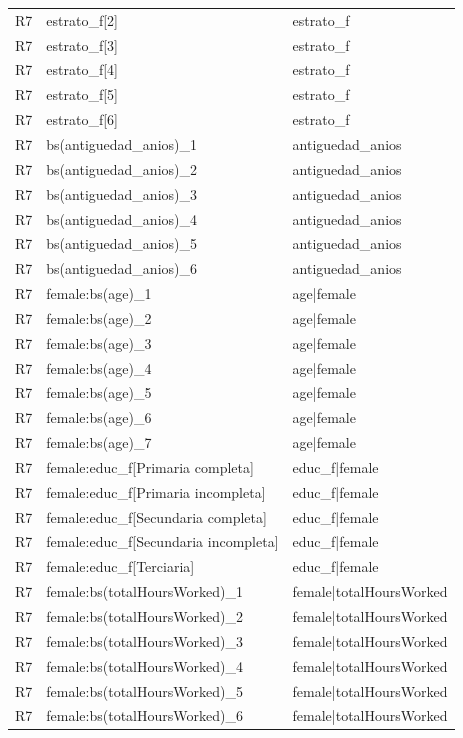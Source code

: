 \begin{longtable}{lll}
R7 & estrato\_f[2] & estrato\_f \\
R7 & estrato\_f[3] & estrato\_f \\
R7 & estrato\_f[4] & estrato\_f \\
R7 & estrato\_f[5] & estrato\_f \\
R7 & estrato\_f[6] & estrato\_f \\
R7 & bs(antiguedad\_anios)\_1 & antiguedad\_anios \\
R7 & bs(antiguedad\_anios)\_2 & antiguedad\_anios \\
R7 & bs(antiguedad\_anios)\_3 & antiguedad\_anios \\
R7 & bs(antiguedad\_anios)\_4 & antiguedad\_anios \\
R7 & bs(antiguedad\_anios)\_5 & antiguedad\_anios \\
R7 & bs(antiguedad\_anios)\_6 & antiguedad\_anios \\
R7 & female:bs(age)\_1 & age|female \\
R7 & female:bs(age)\_2 & age|female \\
R7 & female:bs(age)\_3 & age|female \\
R7 & female:bs(age)\_4 & age|female \\
R7 & female:bs(age)\_5 & age|female \\
R7 & female:bs(age)\_6 & age|female \\
R7 & female:bs(age)\_7 & age|female \\
R7 & female:educ\_f[Primaria completa] & educ\_f|female \\
R7 & female:educ\_f[Primaria incompleta] & educ\_f|female \\
R7 & female:educ\_f[Secundaria completa] & educ\_f|female \\
R7 & female:educ\_f[Secundaria incompleta] & educ\_f|female \\
R7 & female:educ\_f[Terciaria] & educ\_f|female \\
R7 & female:bs(totalHoursWorked)\_1 & female|totalHoursWorked \\
R7 & female:bs(totalHoursWorked)\_2 & female|totalHoursWorked \\
R7 & female:bs(totalHoursWorked)\_3 & female|totalHoursWorked \\
R7 & female:bs(totalHoursWorked)\_4 & female|totalHoursWorked \\
R7 & female:bs(totalHoursWorked)\_5 & female|totalHoursWorked \\
R7 & female:bs(totalHoursWorked)\_6 & female|totalHoursWorked \\

\end{longtable}
